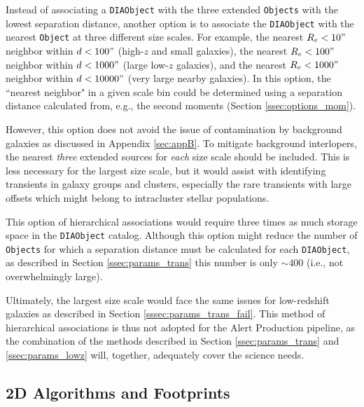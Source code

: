 \documentclass[DM,authoryear,toc]{lsstdoc}
\begin{document}
Instead of associating a {\tt DIAObject} with the three extended {\tt Objects} with the lowest separation distance, another option is to associate the {\tt DIAObject} with the  nearest {\tt Object} at three different size scales.
For example, the nearest $R_e<10"$ neighbor within $d<100"$ (high-$z$ and small galaxies), the nearest $R_e<100"$ neighbor within $d<1000"$ (large low-$z$ galaxies), and the nearest $R_e<1000"$ neighbor within $d<10000"$ (very large nearby galaxies).
In this option, the ``nearest neighbor" in a given scale bin could be determined using a separation distance calculated from, e.g., the second moments (Section \ref{ssec:options_mom}).

However, this option does not avoid the issue of contamination by background galaxies as discussed in Appendix \ref{sec:appB}.
To mitigate background interlopers, the nearest \emph{three} extended sources for \textit{each} size scale should be included.
This is less necessary for the largest size scale, but it would assist with identifying transients in galaxy groups and clusters, especially the rare transients with large offsets which might belong to intracluster stellar populations.

This option of hierarchical associations would require three times as much storage space in the {\tt DIAObject} catalog.
Although this option might reduce the number of {\tt Objects} for which a separation distance must be calculated for each {\tt DIAObject}, as described in Section \ref{ssec:params_trans} this number is only $\sim$400 (i.e., not overwhelmingly large). 

Ultimately, the largest size scale would face the same issues for low-redshift galaxies as described in Section \ref{sssec:params_trans_fail}. 
This method of hierarchical associations is thus not adopted for the Alert Production pipeline, as the combination of the methods described in Section \ref{ssec:params_trans} and \ref{ssec:params_lowz} will, together, adequately cover the science needs.

\subsection{2D Algorithms and Footprints}
\end{document}
